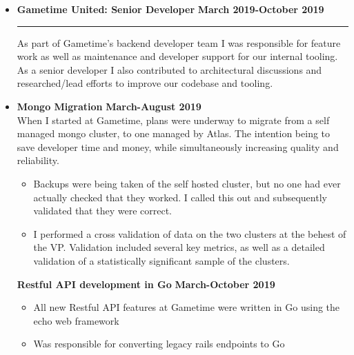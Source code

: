 \documentclass[overlapped]{res}
\begin{document}
\begin{resume}
\begin{itemize}[leftmargin=0in]
\end{itemize}
\vspace{0.25in}
\begin{itemize}[leftmargin=0in]
    \item[]
        \textbf{Gametime United: Senior Developer} \hfill \textbf{March 2019-October 2019} \\[-0.1in] \rule{\textwidth}{0.5pt}
        As part of Gametime's backend developer team I was responsible for feature work as well as maintenance and developer support for our internal tooling.
        As a senior developer I also contributed to architectural discussions and researched/lead efforts to improve our codebase and tooling.
        \vspace{0.125in}
        \item[] 
            \textbf{Mongo Migration} \hfill \textbf{March-August 2019} \\
            When I started at Gametime, plans were underway to migrate from a self managed mongo cluster, to one managed by Atlas.
            The intention being to save developer time and money, while simultaneously increasing quality and reliability.
            \begin{itemize}
                \item[\textbullet] Backups were being taken of the self hosted cluster, but no one had ever actually checked that they worked. I called this out and subsequently validated that they were correct.
                \item[\textbullet] I performed a cross validation of data on the two clusters at the behest of the VP. Validation included several key metrics, as well as a detailed validation of a statistically significant sample of the clusters.
            \end{itemize}
        \vspace{0.125in}

        \textbf{Restful API development in Go} \hfill \textbf{March-October 2019} \\
        \begin{itemize}
            \item[\textbullet] All new Restful API features at Gametime were written in Go using the echo web framework
            \item[\textbullet] Was responsible for converting legacy rails endpoints to Go
        \end{itemize}
        \vspace{0.125in}


\end{itemize}
\end{resume}
\end{document}
